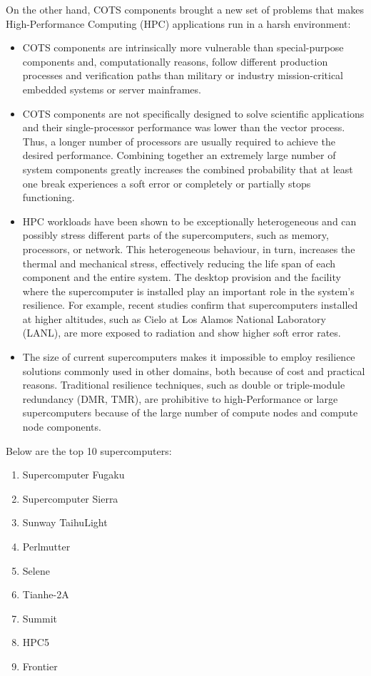 \documentclass[11pt, letterpaper, english]{article}
\begin{document}
\par{On the other hand, COTS components brought a new set of problems
that makes High-Performance Computing (HPC) applications run in a harsh environment:}
\begin{itemize}
    \item COTS components are intrinsically more vulnerable than special-purpose components and, computationally reasons, follow different production processes and verification paths than military or industry mission-critical embedded systems or server mainframes.
    \item COTS components are not specifically designed to solve scientific applications and their single-processor performance was lower than the vector process. Thus, a longer number of processors are usually required to achieve the desired performance. Combining together an extremely large number of system components greatly increases the combined probability that at least one break experiences a soft error or completely or partially stops functioning.
    \item HPC workloads have been shown to be exceptionally heterogeneous and can possibly stress different parts of the supercomputers, such as memory, processors, or network. This heterogeneous behaviour, in turn, increases the thermal and mechanical stress, effectively reducing the life span of each component and the entire system. The desktop provision and the facility where the supercomputer is installed play an important role in the system's resilience. For example, recent studies confirm that supercomputers installed at higher altitudes, such as Cielo at Los Alamos National Laboratory (LANL), are more exposed to radiation and show higher soft error rates.
    \item The size of current supercomputers makes it impossible to employ resilience solutions commonly used in other domains, both because of cost and practical reasons. Traditional resilience techniques, such as double or triple-module redundancy (DMR, TMR), are prohibitive to high-Performance or large supercomputers because of the large number of compute nodes and compute node components. 
\end{itemize}

\par {Below are the top 10 supercomputers:}
\begin{enumerate}[1.]
    \item Supercomputer Fugaku
    \item Supercomputer Sierra
    \item Sunway TaihuLight
    \item Perlmutter
    \item Selene
    \item Tianhe-2A
    \item Summit
    \item HPC5
    \item Frontier
\end{enumerate}
\end{document}
